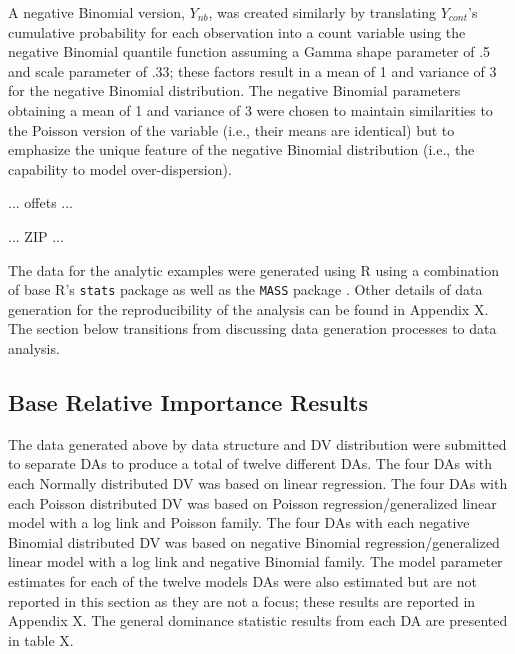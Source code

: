 \documentclass[ShortAfour,times,sageapa]{sagej}
\begin{document}
	A negative Binomial version, $Y_{nb}$, was created similarly by translating $Y_{cont}$'s cumulative probability for each observation into a count variable using the negative Binomial quantile function assuming a Gamma shape parameter of .5 and scale parameter of .33; these factors result in a mean of 1 and variance of 3 for the negative Binomial distribution.  
	The negative Binomial parameters obtaining a mean of 1 and variance of 3 were chosen to maintain similarities to the Poisson version of the variable (i.e., their means are identical) but to emphasize the unique feature of the negative Binomial distribution (i.e., the capability to model over-dispersion).  
	
	... offets ...
	
	... ZIP ...
	
	The data for the analytic examples were generated using R \cite{R} using a combination of base R's \texttt{stats} package as well as the \texttt{MASS} package \cite{MASS}.  
	Other details of data generation for the reproducibility of the analysis can be found in Appendix X.  
	The section below transitions from discussing data generation processes to data analysis.
	
	\subsection{Base Relative Importance Results}
	
	The data generated above by data structure and DV distribution were submitted to separate DAs to produce a total of twelve different DAs.
	The four DAs with each Normally distributed DV was based on linear regression.
	The four DAs with each Poisson distributed DV was based on Poisson regression/generalized linear model with a log link and Poisson family.
	The four DAs with each negative Binomial distributed DV was based on negative Binomial regression/generalized linear model with a log link and negative Binomial family.
	The model parameter estimates for each of the twelve models DAs were also estimated but are not reported in this section as they are not a focus; these results are reported in Appendix X. 
	The general dominance statistic results from each DA are presented in table X.
	
	
	
	
\end{document}
